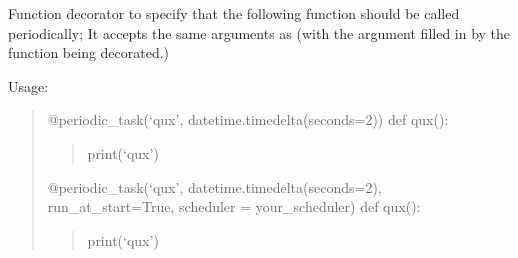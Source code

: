\documentclass[letterpaper,10pt,english]{sphinxmanual}
\begin{document}

\begin{fulllineitems}
\label{\detokenize{periodic_tasks:periodic_tasks.foo}}
\end{fulllineitems}


\begin{fulllineitems}
\label{\detokenize{periodic_tasks:periodic_tasks.periodic_task}}
Function decorator to specify that the following function
should be called periodically;
It accepts the same arguments as  (with the  argument filled in by the function being decorated.)

Usage:
\begin{quote}

@periodic\_task(‘qux’, datetime.timedelta(seconds=2))
def qux():
\begin{quote}

print(‘qux’)
\end{quote}

@periodic\_task(‘qux’, datetime.timedelta(seconds=2), run\_at\_start=True, scheduler = your\_scheduler)
def qux():
\begin{quote}

print(‘qux’)
\end{quote}
\end{quote}

\end{fulllineitems}


\begin{fulllineitems}
\label{\detokenize{periodic_tasks:periodic_tasks.qux}}
\end{fulllineitems}

\end{document}

